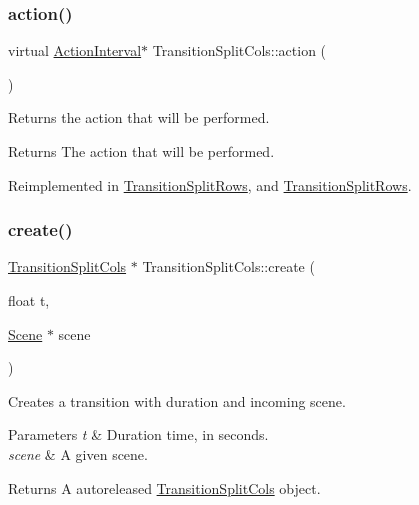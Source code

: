 \subsubsection{\texorpdfstring{action()}{action()}\hspace{0.1cm}{\footnotesize\ttfamily [2/2]}}
{\footnotesize\ttfamily virtual \hyperlink{classActionInterval}{Action\+Interval}$\ast$ Transition\+Split\+Cols\+::action (\begin{DoxyParamCaption}{ }\end{DoxyParamCaption})\hspace{0.3cm}{\ttfamily [virtual]}}

Returns the action that will be performed.

\begin{DoxyReturn}{Returns}
The action that will be performed. 
\end{DoxyReturn}


Reimplemented in \hyperlink{classTransitionSplitRows_ac24473a717ed730485921a329dc9c5de}{Transition\+Split\+Rows}, and \hyperlink{classTransitionSplitRows_acd330cd9bde2c1fb7d3da21befa5918e}{Transition\+Split\+Rows}.

\mbox{\label{classTransitionSplitCols_a06b99be6e7f74cbe3755366e61f65e28}} 
\subsubsection{\texorpdfstring{create()}{create()}\hspace{0.1cm}{\footnotesize\ttfamily [1/2]}}
{\footnotesize\ttfamily \hyperlink{classTransitionSplitCols}{Transition\+Split\+Cols} $\ast$ Transition\+Split\+Cols\+::create (\begin{DoxyParamCaption}\item[{float}]{t,  }\item[{\hyperlink{classScene}{Scene} $\ast$}]{scene }\end{DoxyParamCaption})\hspace{0.3cm}{\ttfamily [static]}}

Creates a transition with duration and incoming scene.


\begin{DoxyParams}{Parameters}
{\em t} & Duration time, in seconds. \\
\hline
{\em scene} & A given scene. \\
\hline
\end{DoxyParams}
\begin{DoxyReturn}{Returns}
A autoreleased \hyperlink{classTransitionSplitCols}{Transition\+Split\+Cols} object. 
\end{DoxyReturn}
\mbox{\label{classTransitionSplitCols_ab87aa4a19b93706dcd36d9b7c28ac2a7}} 
